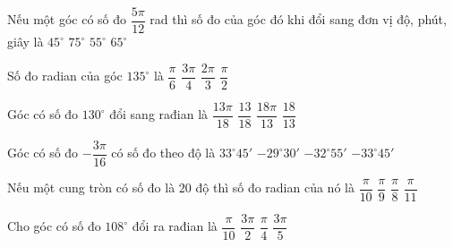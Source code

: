 \begin{ex}%
	Nếu một góc có số đo $\dfrac{5\pi}{12}$ rad thì số đo  của góc đó khi đổi sang đơn vị độ, phút, giây là
	\choice 
		 {$45^\circ$}
		 {\True $75^\circ$}
		{$55^\circ$} 
		{$65^\circ$} 
\end{ex}

\begin{ex}%
	Số đo radian của  góc $135^\circ$ là
	\choice 
		 {$\dfrac{\pi}{6}$}
		 {\True $\dfrac{3\pi}{4}$}
		{$\dfrac{2\pi}{3}$} 
		 {$\dfrac{\pi}{2}$}
\end{ex}

\begin{ex}%
	Góc có số  đo $130^\circ$ đổi sang rađian là
	\choice 
		{\True $\dfrac{13\pi}{18}$} 
		{$\dfrac{13}{18}$} 
		 {$\dfrac{18\pi}{13}$}
		 {$\dfrac{18}{13}$}
\end{ex}

\begin{ex}%
	Góc có số đo $-\dfrac{3\pi}{16}$ có số đo theo độ  là
	 \choice
		 {$33^{\circ} 45'$}
		{$-29^{\circ} 30'$} 
		{$-32^{\circ}  55'$}
		{\True $-33^{\circ} 45'$} 
\end{ex}

\begin{ex}%
	 Nếu một cung tròn có số đo là $20$ độ thì số đo radian của nó là
	 \choice
		{$\dfrac{\pi}{10}$} 
		{\True  $\dfrac{\pi}{9}$}
		{$\dfrac{\pi}{8}$} 
		{$\dfrac{\pi}{11}$} 
\end{ex}

\begin{ex}%
	Cho  góc có số đo $108^\circ$ đổi ra rađian là
	\choice 
		 {$\dfrac{\pi}{10}$}
		 {$\dfrac{3\pi}{2}$}
		{$\dfrac{\pi}{4}$} 
		{\True  $\dfrac{3\pi}{5}$}
\end{ex}

